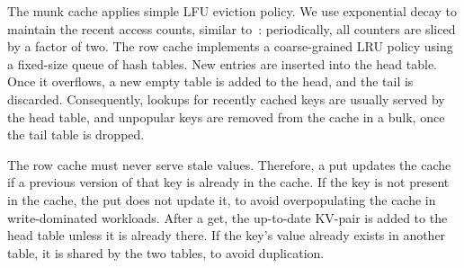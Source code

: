 The munk cache applies simple LFU eviction policy. %
We use exponential decay to maintain the recent access counts, similar to~\cite{tinyLFU}: periodically, all counters are 
sliced by a factor of two. 
The row cache implements a coarse-grained LRU policy using a fixed-size queue of hash tables. 
New entries are inserted into the head table. Once it overflows, a new empty table is added to the head,
and the tail is discarded. Consequently, lookups for recently cached keys are usually served by the head 
table, and unpopular keys are removed from the cache in a bulk, once the tail table is dropped.

The row cache must never serve stale values. %
Therefore, a put updates the cache  if a previous version of that key is already in the cache. 
If the key is not present in the cache, the put does not update it, to avoid overpopulating the cache 
in write-dominated workloads. After a get, the up-to-date KV-pair is added to the head table unless it is already there.
If the key's value already exists in another table, it is shared by the two tables, to avoid duplication.

